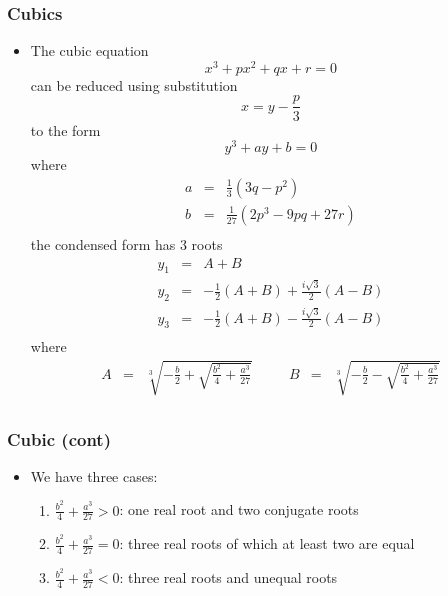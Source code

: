 \documentclass[10pt]{beamer}
\begin{document}
\begin{frame}
  \frametitle{Cubics}
  \begin{itemize}
  \item The cubic equation
    \[
      x^3 + px^2 + qx +r =0
    \] can be reduced using substitution
    \[
      x = y - \frac{p}{3}
    \] to the form
    \[
      y^3 +  a y + b = 0
    \] where
    \[
      \begin{array}{rcl}
        a &= & \frac{1}{3} (3q - p^2)\\
        b &= & \frac{1}{27} (2p^3 - 9 pq + 27r)\\
      \end{array}
    \] the condensed form has 3 roots
    \[
      \begin{array}{rcl}
        y_1& = & A+B\\
        y_2& = & -\frac{1}{2}(A+B) + \frac{i \sqrt{3}}{2} (A-B)\\
        y_3& = & -\frac{1}{2}(A+B) - \frac{i \sqrt{3}}{2} (A-B)\\
      \end{array}
    \] where
    \[
      \begin{array}{rclcrcl}
        A & = & \sqrt[3]{- \frac{b}{2} + \sqrt{\frac{b^2}{4} + \frac{a^3}{27}}} & \mbox {~~~} &
        B & = & \sqrt[3]{- \frac{b}{2} - \sqrt{\frac{b^2}{4} + \frac{a^3}{27}}}\\                                                                                                        
      \end{array}
    \]
  \end{itemize}
\end{frame}

\begin{frame}
  \frametitle{Cubic (cont)}
  \begin{itemize}
  \item We have three cases:
    \begin{enumerate}
    \item $\frac{b^2}{4} + \frac{a^3}{27} > 0$: one real root and two conjugate roots
    \item $\frac{b^2}{4} + \frac{a^3}{27} = 0$: three real roots of which at least two are equal
    \item $\frac{b^2}{4} + \frac{a^3}{27} < 0$: three real roots and unequal roots
    \end{enumerate}
  \end{itemize}
\end{frame}
\end{document}
